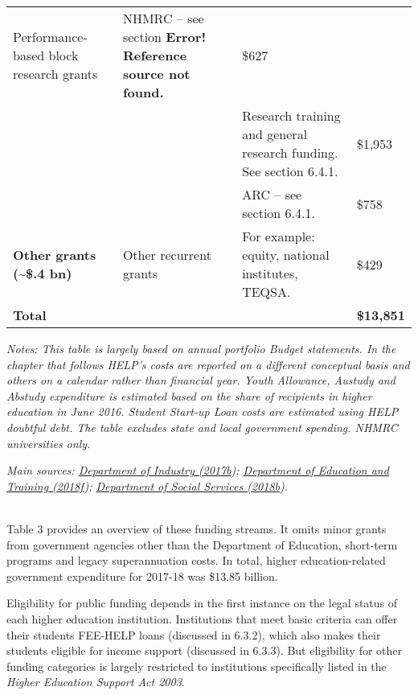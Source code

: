 \documentclass[]{book}
\begin{document}
\begin{longtable}[]{@{}llll@{}}
\begin{minipage}[t]{0.24\columnwidth}
Performance-based block research grants\strut
\end{minipage} & \begin{minipage}[t]{0.24\columnwidth}\raggedright
NHMRC -- see section \textbf{Error! Reference source not found.}\strut
\end{minipage} & \begin{minipage}[t]{0.24\columnwidth}\raggedright
\$627\strut
\end{minipage}\tabularnewline
& & Research training and general research funding. See section 6.4.1. & \$1,953\tabularnewline
& & ARC -- see section 6.4.1. & \$758\tabularnewline
\textbf{Other grants (\textasciitilde{}\$.4 bn)} & Other recurrent grants & For example: equity, national institutes, TEQSA. & \$429\tabularnewline
\textbf{Total} & & & \textbf{\$13,851}\tabularnewline
\bottomrule
\end{longtable}

\emph{Notes: This table is largely based on annual portfolio Budget statements. In the chapter that follows HELP's costs are reported on a different conceptual basis and others on a calendar rather than financial year. Youth Allowance, Austudy and Abstudy expenditure is estimated based on the share of recipients in higher education in June 2016. Student Start-up Loan costs are estimated using HELP doubtful debt. The table excludes state and local government spending. NHMRC universities only.}

\emph{Main sources: \protect\hyperlink{_ENREF_102}{Department of Industry (2017b}); \protect\hyperlink{_ENREF_85}{Department of Education and Training (2018f}); \protect\hyperlink{_ENREF_108}{Department of Social Services (2018b}).}

\emph{\\
}Table 3 provides an overview of these funding streams. It omits minor grants from government agencies other than the Department of Education, short-term programs and legacy superannuation costs. In total, higher education-related government expenditure for 2017-18 was \$13.85 billion.

Eligibility for public funding depends in the first instance on the legal status of each higher education institution. Institutions that meet basic criteria can offer their students FEE-HELP loans (discussed in 6.3.2), which also makes their students eligible for income support (discussed in 6.3.3). But eligibility for other funding categories is largely restricted to institutions specifically listed in the \emph{Higher Education Support Act 2003}.
\end{document}
